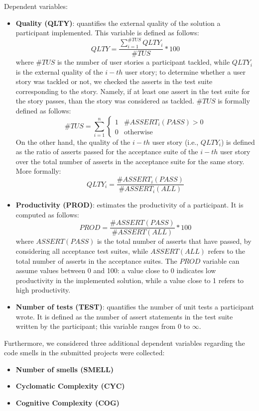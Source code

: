 Dependent variables:
\begin{itemize}
    \item \textbf{Quality (QLTY)}: quantifies the external quality of the solution a participant implemented. This variable is defined as follows: 
        \[
            QLTY = \frac{\sum_{i=1}^{\#TUS} QLTY_i}{\#TUS} * 100 
        \]
    where $\#TUS$ is the number of user stories a participant tackled, while $QLTY_i$ is the external quality of the $i-th$ user story; to determine whether a user story was tackled or not, we checked the asserts in the test suite corresponding to the story. Namely, if at least one assert in the test suite for the story passes, than the story was considered as tackled. $\#TUS$ is formally defined as follows:
        \[
            \#TUS = \sum_{i=1}^{n} 
                \begin{cases}
                    1 & \text{$\#ASSERT_i(PASS) > 0$}\\
                    0 & \text{otherwise}
                \end{cases}
        \]
    On the other hand, the quality of the $i-th$ user story (i.e., $QLTY_i$) is defined as the ratio of asserts passed for the acceptance suite of the $i-th$ user story over the total number of asserts in the acceptance suite for the same story. More formally:
        \[
            QLTY_i = \frac{\#ASSERT_i(PASS)}{\#ASSERT_i(ALL)}
        \]
    \item \textbf{Productivity (PROD)}: estimates the productivity of a participant. It is computed as follows:
        \[
            PROD = \frac{\#ASSERT(PASS)}{\#ASSERT(ALL)} * 100
        \]
    where $ASSERT(PASS)$ is the total number of asserts that have passed, by considering all acceptance test suites, while $ASSERT(ALL)$ refers to the total number of asserts in the acceptance suites. The $PROD$ variable can assume values between 0 and 100: a value close to 0 indicates low productivity in the implemented solution, while a value close to 1 refers to high productivity.
    \item \textbf{Number of tests (TEST)}: quantifies the number of unit tests a participant wrote. It is defined as the number of assert statements in the test suite written by the participant; this variable ranges from 0 to $\infty$.
\end{itemize}


Furthermore, we considered three additional dependent variables regarding the code smells in the submitted projects were collected:
\begin{itemize}
    \item \textbf{Number of smells (SMELL)}
    \item \textbf{Cyclomatic Complexity (CYC)}
    \item \textbf{Cognitive Complexity (COG)}
\end{itemize}



